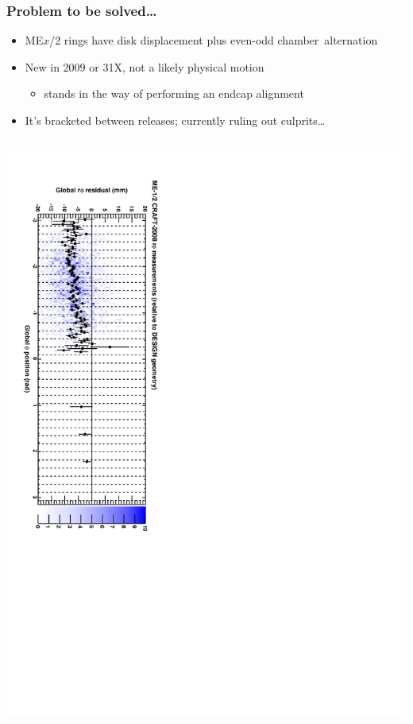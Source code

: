\documentclass[compress]{beamer}
\begin{document}
\begin{frame}
\frametitle{Problem to be solved\ldots}

\begin{itemize}
\item ME$x$/2 rings have disk displacement plus even-odd \mbox{chamber alternation\hspace{-1 cm}}
\item New in 2009 or 31X, not a likely physical motion
\begin{itemize}
\item stands in the way of performing an endcap alignment
\end{itemize}
\item It's bracketed between releases; currently ruling out culprits\ldots
\end{itemize}

\begin{columns}
\includegraphics[height=\linewidth, angle=90]{alternation_2008_mem12_design.pdf}


\end{columns}
\end{frame}
\end{document}
